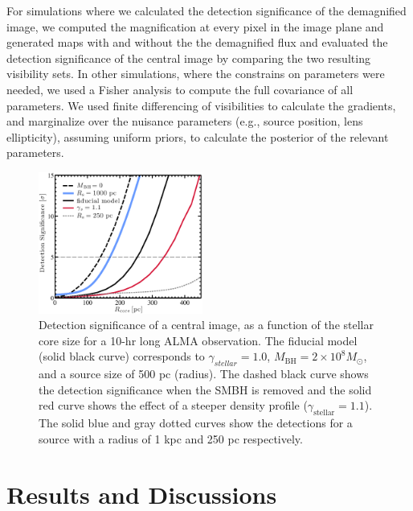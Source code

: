 \documentclass[chicago]{emulateapj}
\begin{document}
For simulations where we calculated the detection significance of the demagnified image, we computed the magnification at every pixel in the image plane and generated maps with and without the the demagnified flux and evaluated the detection significance of the central image by comparing the two resulting visibility sets. In other simulations, where the constrains on parameters were needed, we used a Fisher analysis to compute the full covariance of all parameters. 
We used finite differencing of visibilities to calculate the gradients, and marginalize over the nuisance parameters (e.g., source position, lens ellipticity), assuming uniform priors, to calculate the posterior of the relevant parameters. 





\begin{figure}
\begin{center}
\centering
\includegraphics[trim= 0 0 0 0, clip,width=0.48\textwidth]{figures/f_03.eps}
\centering
\end{center}
\caption{ Detection significance of a central image, as a function of the stellar core size for a 10-hr long ALMA observation. 
The fiducial model (solid black curve) corresponds to $\gamma_{stellar}=1.0$, $M_{\mathrm{BH}}=2\times10^8 M_{\odot}$, and a source size of 500 pc (radius). The dashed black curve shows the detection significance when the SMBH is removed and the solid red curve shows the effect of a steeper density profile ($\gamma_{\mathrm{stellar}}=1.1$). The solid blue and gray dotted curves show the detections for a source with a radius of 1 kpc and 250 pc respectively. 
\label{fig:3}}
\end{figure}

\section{Results and Discussions}
\end{document}
